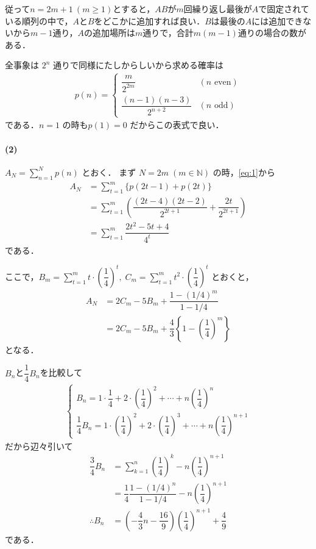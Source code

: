 \documentclass[../../main.tex]{subfiles}
\begin{document}
従って$n=2m+1 \ (m\ge1)$とすると，$AB$が$m$回繰り返し最後が$A$で固定されている順列の中で，$A$と$B$をどこかに追加すれば良い．$B$は最後の$A$には追加できないから$m-1$通り，$A$の追加場所は$m$通りで，合計$m(m-1)$通りの場合の数がある．
\casesend

全事象は $2^n$ 通りで同様にたしからしいから求める確率は
\begin{align}
  p(n) =
  \begin{cases}
    \dfrac{m}{2^{2m}} & (n \text{ even}) \\[10pt]
    \dfrac{(n-1)(n-3)}{2^{n+2}} & (n \text{ odd})
  \end{cases} \label{eq:1}
\end{align}
である．$n=1$ の時も$p(1) = 0$ だからこの表式で良い．

\paragraph{(2)}

$A_N = \sum_{n=1}^N p(n)$ とおく．
まず $N = 2m \; (m \in \mathbb{N})$ の時，\cref{eq:1}から
\begin{align}
  A_N
  &= \sum_{t=1}^m \{ p(2t-1) + p(2t) \} \\
  &= \sum_{t=1}^m \left( \dfrac{(2t-4)(2t-2)}{2^{2t+1}} + \dfrac{2t}{2^{2t+1}} \right) \\
  &= \sum_{t=1}^m \dfrac{2t^2 - 5t + 4}{4^t}
\end{align}
である．

ここで，$B_m = \sum_{t=1}^m t \cdot \left(\dfrac{1}{4}\right)^t, \; C_m = \sum_{t=1}^m t^2 \cdot \left(\dfrac{1}{4}\right)^t$ とおくと，
\begin{align}
  A_N
  & = 2C_m - 5 B_m + \dfrac{1-\left(1/4\right)^m}{1-1/4} \\
  & = 2C_m - 5 B_m + \dfrac{4}{3}\left\{1-\left(\dfrac{1}{4}\right)^m\right\} \label{eq:2}
\end{align}
となる．

$B_n$と$\dfrac{1}{4}B_n$を比較して
\begin{align}
  \begin{cases}
    B_n = 1\cdot\dfrac{1}{4} + 2\cdot\left(\dfrac{1}{4}\right)^2 + \cdots + n\left(\dfrac{1}{4}\right)^n \\
    \dfrac{1}{4}B_n = 1\cdot\left(\dfrac{1}{4}\right)^2 + 2\cdot\left(\dfrac{1}{4}\right)^3 + \cdots + n\left(\dfrac{1}{4}\right)^{n+1}
  \end{cases}
\end{align}
だから辺々引いて
\begin{align}
  \dfrac{3}{4}B_n
  & = \sum_{k=1}^{n}\left(\dfrac{1}{4}\right)^{k}-n\left(\dfrac{1}{4}\right)^{n+1} \\
  & = \dfrac{1}{4}\dfrac{1-(1/4)^{n}}{1-1/4} - n\left(\dfrac{1}{4}\right)^{n+1} \\
  \therefore
  B_n
  & = \left(-\dfrac{4}{3}n-\dfrac{16}{9}\right)\left(\dfrac{1}{4}\right)^{n+1} + \dfrac{4}{9} \label{eq:3}
\end{align}
である．
\end{document}
